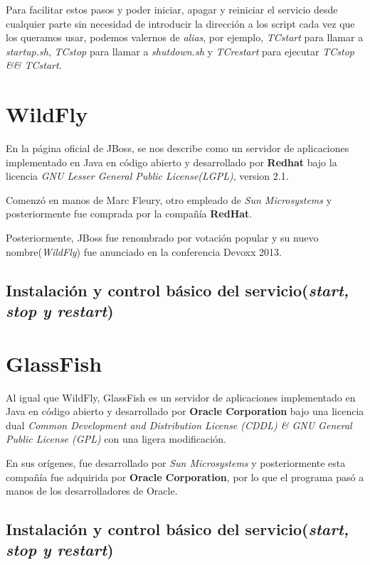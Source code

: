 \documentclass[a4paper, 10pt]{article}
\begin{document}
		Para facilitar estos pasos y poder iniciar, apagar y reiniciar el servicio desde cualquier
		parte sin necesidad de introducir la dirección a los script cada vez que los queramos usar,
		podemos valernos de \textit{alias}, por ejemplo, \textit{TCstart} para llamar a \textit{
		startup.sh}, \textit{TCstop} para llamar a \textit{shutdown.sh} y \textit{TCrestart} para
		ejecutar \textit{TCstop \&\& TCstart}.
	
\section{WildFly}
	En la página oficial de JBoss\cite{JB_official}, se nos describe como un servidor de aplicaciones
	implementado en Java en código abierto y desarrollado por \textbf{Redhat} bajo la licencia
	\textit{GNU Lesser General Public License(LGPL)}, version 2.1.
	
	Comenzó en manos de Marc Fleury, otro empleado de \textit{Sun Microsystems} y posteriormente fue
	comprada por la compañía \textbf{RedHat}.

	Posteriormente, JBoss fue renombrado por votación popular\cite{JB_vote}\cite{WF_install} y su nuevo
	nombre(\textit{WildFly}) fue anunciado en la conferencia Devoxx 2013.\cite{WF_install}\cite{WF_name}

	\subsection{Instalación y control básico del servicio(\textit{start, stop y restart})}

\section{GlassFish}

	Al igual que WildFly, GlassFish es un servidor de aplicaciones implementado en Java en código
	abierto y desarrollado por \textbf{Oracle Corporation} bajo una licencia dual \textit{Common
	Development and Distribution License (CDDL) \& GNU General Public License (GPL)} con una ligera
	modificación.\cite{GF_official}\cite{GF_install}
	
	En sus orígenes, fue desarrollado por \textit{Sun Microsystems} y posteriormente esta compañía
	fue adquirida por \textbf{Oracle Corporation}, por lo que el programa pasó a manos de los
	desarrolladores de Oracle.

	\subsection{Instalación y control básico del servicio(\textit{start, stop y restart})}
\end{document}
